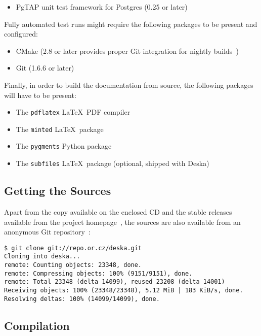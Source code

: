\documentclass[deska]{subfiles}
\begin{document}
\begin{itemize}
    \item PgTAP unit test framework for Postgres (0.25 or later)~\cite{pgtap}
\end{itemize}

Fully automated test runs might require the following packages to be present and configured:

\begin{itemize}
    \item CMake (2.8 or later provides proper Git integration for nightly builds~\cite{deska-dashboard})
    \item Git (1.6.6 or later)
\end{itemize}

Finally, in order to build the documentation from source, the following packages will have to be present:

\begin{itemize}
    \item The {\tt pdflatex} \LaTeX~PDF compiler
    \item The {\tt minted} \LaTeX~package~\cite{latex-minted}
    \item The {\tt pygments} Python package~\cite{pygments}
    \item The {\tt subfiles} \LaTeX~package (optional, shipped with Deska)~\cite{latex-subfiles}
\end{itemize}

\subsection{Getting the Sources}

Apart from the copy available on the enclosed CD and the stable releases available from the project
homepage~\cite{deska-project}, the sources are also available from an anonymous Git repository~\cite{deska-git}:

\begin{verbatim}
$ git clone git://repo.or.cz/deska.git
Cloning into deska...
remote: Counting objects: 23348, done.
remote: Compressing objects: 100% (9151/9151), done.
remote: Total 23348 (delta 14099), reused 23208 (delta 14001)
Receiving objects: 100% (23348/23348), 5.12 MiB | 183 KiB/s, done.
Resolving deltas: 100% (14099/14099), done.
\end{verbatim}

\subsection{Compilation}
\end{document}
